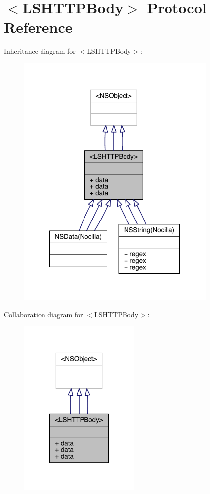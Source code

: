 \hypertarget{protocol_l_s_h_t_t_p_body-p}{\section{$<$L\-S\-H\-T\-T\-P\-Body$>$ Protocol Reference}
\label{protocol_l_s_h_t_t_p_body-p}
}


Inheritance diagram for $<$L\-S\-H\-T\-T\-P\-Body$>$\-:\nopagebreak
\begin{figure}[H]
\begin{center}
\leavevmode
\includegraphics[width=277pt]{protocol_l_s_h_t_t_p_body-p__inherit__graph}
\end{center}
\end{figure}


Collaboration diagram for $<$L\-S\-H\-T\-T\-P\-Body$>$\-:\nopagebreak
\begin{figure}[H]
\begin{center}
\leavevmode
\includegraphics[width=168pt]{protocol_l_s_h_t_t_p_body-p__coll__graph}
\end{center}
\end{figure}
